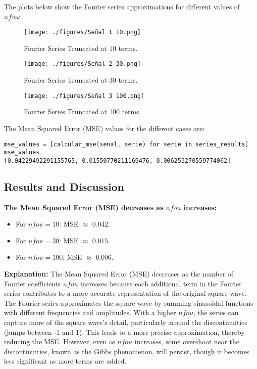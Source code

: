 \documentclass[10pt]{article}
\theoremstyle{definition}
\theoremstyle{remark}
\theoremstyle{definition}
\numberwithin{equation}{prob}
\begin{document}
The plots below show the Fourier series approximations for different values of \(nfou\):

\begin{figure}[h!]
    \centering
    \texttt{[image: ./figures/Señal 1 10.png]}
    \caption{Fourier Series Truncated at 10 terms.}
\end{figure}

\begin{figure}[h!]
    \centering
    \texttt{[image: ./figures/Señal 2 30.png]}
    \caption{Fourier Series Truncated at 30 terms.}
\end{figure}

\begin{figure}[h!]
    \centering
    \texttt{[image: ./figures/Señal 3 100.png]}
    \caption{Fourier Series Truncated at 100 terms.}
\end{figure}

The Mean Squared Error (MSE) values for the different cases are:

\begin{lstlisting}
mse_values = [calcular_mse(senal, serie) for serie in series_results]
mse_values
[0.04229492291155765, 0.01550770211169476, 0.006253270559774062]
\end{lstlisting}

\subsection*{Results and Discussion}

\textbf{The Mean Squared Error (MSE) decreases as \( nfou \) increases:}
\begin{itemize}
    \item For \( nfou = 10 \): MSE \( \approx \) 0.042.
    \item For \( nfou = 30 \): MSE \( \approx \) 0.015.
    \item For \( nfou = 100 \): MSE \( \approx \) 0.006.
\end{itemize}

\textbf{Explanation:} The Mean Squared Error (MSE) decreases as the number of Fourier coefficients \( nfou \) increases because each additional term in the Fourier series contributes to a more accurate representation of the original square wave. The Fourier series approximates the square wave by summing sinusoidal functions with different frequencies and amplitudes. With a higher \( nfou \), the series can capture more of the square wave's detail, particularly around the discontinuities (jumps between -1 and 1). This leads to a more precise approximation, thereby reducing the MSE. However, even as \( nfou \) increases, some overshoot near the discontinuities, known as the Gibbs phenomenon, will persist, though it becomes less significant as more terms are added.
\end{document}
